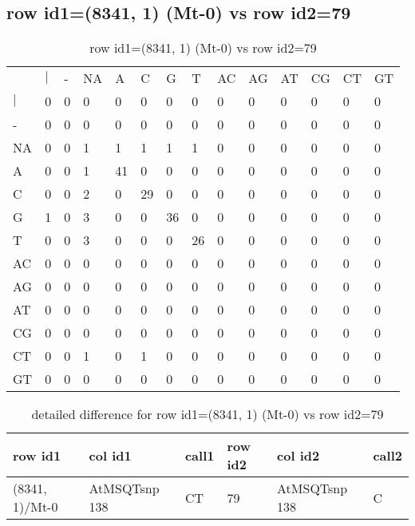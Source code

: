 \subsection{row id1=(8341, 1) (Mt-0) vs row id2=79}
\begin{center}
\begin{longtable}{|l|l|l|l|l|l|l|l|l|l|l|l|l|l|}
\caption{row id1=(8341, 1) (Mt-0) vs row id2=79} \label{table_dm348}\\
\hline
\\
\hline
&$|$&-&NA&A&C&G&T&AC&AG&AT&CG&CT&GT\\
$|$&0&0&0&0&0&0&0&0&0&0&0&0&0\\
-&0&0&0&0&0&0&0&0&0&0&0&0&0\\
NA&0&0&1&1&1&1&1&0&0&0&0&0&0\\
A&0&0&1&41&0&0&0&0&0&0&0&0&0\\
C&0&0&2&0&29&0&0&0&0&0&0&0&0\\
G&1&0&3&0&0&36&0&0&0&0&0&0&0\\
T&0&0&3&0&0&0&26&0&0&0&0&0&0\\
AC&0&0&0&0&0&0&0&0&0&0&0&0&0\\
AG&0&0&0&0&0&0&0&0&0&0&0&0&0\\
AT&0&0&0&0&0&0&0&0&0&0&0&0&0\\
CG&0&0&0&0&0&0&0&0&0&0&0&0&0\\
CT&0&0&1&0&1&0&0&0&0&0&0&0&0\\
GT&0&0&0&0&0&0&0&0&0&0&0&0&0\\
\hline
\end{longtable}
\end{center}

\begin{center}
\begin{longtable}{|l|l|l|l|l|l|}
\caption{detailed difference for row id1=(8341, 1) (Mt-0) vs row id2=79} \label{table_dm349}\\
\hline
row id1&col id1&call1&row id2&col id2&call2\\
\hline
(8341, 1)/Mt-0&AtMSQTsnp 138&CT&79&AtMSQTsnp 138&C\\
\hline
\end{longtable}
\end{center}

